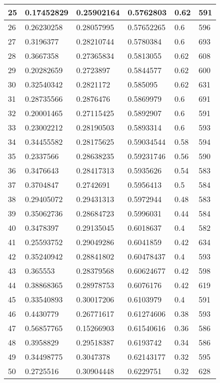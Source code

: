 \begin{longtable}{|l|l|l|l|l|l|}
25 & 0.17452829 & 0.25902164 & 0.5762803 & 0.62 & 591 \\ \hline 
26 & 0.26230258 & 0.28057995 & 0.57652265 & 0.6 & 596 \\ \hline 
27 & 0.3196377 & 0.28210744 & 0.5780384 & 0.6 & 693 \\ \hline 
28 & 0.3667358 & 0.27365834 & 0.5813055 & 0.62 & 608 \\ \hline 
29 & 0.20282659 & 0.2723897 & 0.5844577 & 0.62 & 600 \\ \hline 
30 & 0.32540342 & 0.2821172 & 0.585095 & 0.62 & 631 \\ \hline 
31 & 0.28735566 & 0.2876476 & 0.5869979 & 0.6 & 691 \\ \hline 
32 & 0.20001465 & 0.27115425 & 0.5892907 & 0.6 & 591 \\ \hline 
33 & 0.23002212 & 0.28190503 & 0.5893314 & 0.6 & 593 \\ \hline 
34 & 0.34455582 & 0.28175625 & 0.59034544 & 0.58 & 594 \\ \hline 
35 & 0.2337566 & 0.28638235 & 0.59231746 & 0.56 & 590 \\ \hline 
36 & 0.3476643 & 0.28417313 & 0.5935626 & 0.54 & 583 \\ \hline 
37 & 0.3704847 & 0.2742691 & 0.5956413 & 0.5 & 584 \\ \hline 
38 & 0.29405072 & 0.29431313 & 0.5972944 & 0.48 & 583 \\ \hline 
39 & 0.35062736 & 0.28684723 & 0.5996031 & 0.44 & 584 \\ \hline 
40 & 0.3478397 & 0.29135045 & 0.6018637 & 0.4 & 582 \\ \hline 
41 & 0.25593752 & 0.29049286 & 0.6041859 & 0.42 & 634 \\ \hline 
42 & 0.35240942 & 0.28841802 & 0.60478437 & 0.4 & 593 \\ \hline 
43 & 0.365553 & 0.28379568 & 0.60624677 & 0.42 & 598 \\ \hline 
44 & 0.38868365 & 0.28978753 & 0.6076176 & 0.42 & 619 \\ \hline 
45 & 0.33540893 & 0.30017206 & 0.6103979 & 0.4 & 591 \\ \hline 
46 & 0.4430779 & 0.26771617 & 0.61274606 & 0.38 & 593 \\ \hline 
47 & 0.56857765 & 0.15266903 & 0.61540616 & 0.36 & 586 \\ \hline 
48 & 0.3958829 & 0.29518387 & 0.6193742 & 0.34 & 586 \\ \hline 
49 & 0.34498775 & 0.3047378 & 0.62143177 & 0.32 & 595 \\ \hline 
50 & 0.2725516 & 0.30904448 & 0.6229751 & 0.32 & 628 \\ \hline 
\end{longtable}